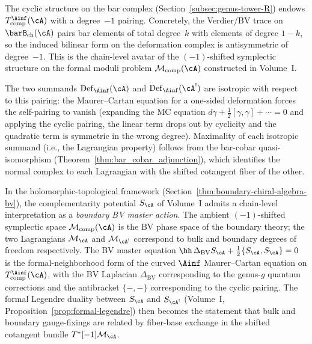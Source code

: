 \begin{remark}
The cyclic structure on the bar complex
(Section~\ref{subsec:genus-tower-R}) endows
$T_{\mathrm{comp}}^{\Ainf}(\cA)$ with a degree~$-1$
pairing. Concretely, the Verdier/BV trace on
$\barB_{\mathrm{ch}}(\cA)$ pairs bar elements of total
degree~$k$ with elements of degree $1-k$, so the induced
bilinear form on the deformation complex is antisymmetric
of degree~$-1$. This is the chain-level avatar of the
$(-1)$-shifted symplectic structure on the formal moduli
problem $\mathcal{M}_{\mathrm{comp}}(\cA)$ constructed in
Volume~I.

The two summands $\mathrm{Def}_{\Ainf}(\cA)$ and
$\mathrm{Def}_{\Ainf}(\cA^!)$ are isotropic with respect
to this pairing: the Maurer--Cartan equation for a
one-sided deformation forces the self-pairing to vanish
(expanding the MC equation $d\gamma + \tfrac{1}{2}[\gamma,\gamma]
+ \cdots = 0$ and applying the cyclic pairing, the linear
term drops out by cyclicity and the quadratic term is
symmetric in the wrong degree). Maximality of each
isotropic summand (i.e., the Lagrangian property) follows
from the bar-cobar quasi-isomorphism
(Theorem~\ref{thm:bar_cobar_adjunction}), which
identifies the normal complex to each Lagrangian with the
shifted cotangent fiber of the other.
\end{remark}

\begin{remark}
In the holomorphic-topological framework
(Section~\ref{thm:boundary-chiral-algebra-bv}), the
complementarity potential $S_\cA$ of Volume~I admits a
chain-level interpretation as a \emph{boundary BV master
action}. The ambient $(-1)$-shifted symplectic space
$\mathcal{M}_{\mathrm{comp}}(\cA)$ is the BV phase space
of the boundary theory; the two Lagrangians
$\mathcal{M}_\cA$ and $\mathcal{M}_{\cA^!}$ correspond to
bulk and boundary degrees of freedom respectively. The
BV master equation
$\hh\,\Delta_{\mathrm{BV}} S_\cA
+ \tfrac{1}{2}\{S_\cA, S_\cA\} = 0$
is the formal-neighborhood form of the curved $\Ainf$
Maurer--Cartan equation on
$T_{\mathrm{comp}}^{\Ainf}(\cA)$, with the BV Laplacian
$\Delta_{\mathrm{BV}}$ corresponding to the genus-$g$
quantum corrections and the antibracket $\{-,-\}$
corresponding to the cyclic pairing. The formal Legendre
duality between $S_\cA$ and $S_{\cA^!}$ (Volume~I,
Proposition~\ref*{prop:formal-legendre}) then becomes the
statement that bulk and boundary gauge-fixings are related
by fiber-base exchange in the shifted cotangent bundle
$T^*[-1]\mathcal{M}_\cA$.
\end{remark}

